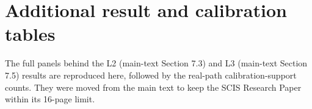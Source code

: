 %
%

\section{Additional result and calibration tables}\label{app:e}

The full panels behind the L2 (main-text Section 7.3) and L3 (main-text
Section 7.5) results are reproduced here, followed by the real-path
calibration-support counts. They were moved from the main text
to keep the SCIS Research Paper within its 16-page limit.

\renewcommand{\thetable}{B\arabic{table}}
\setcounter{table}{11}



